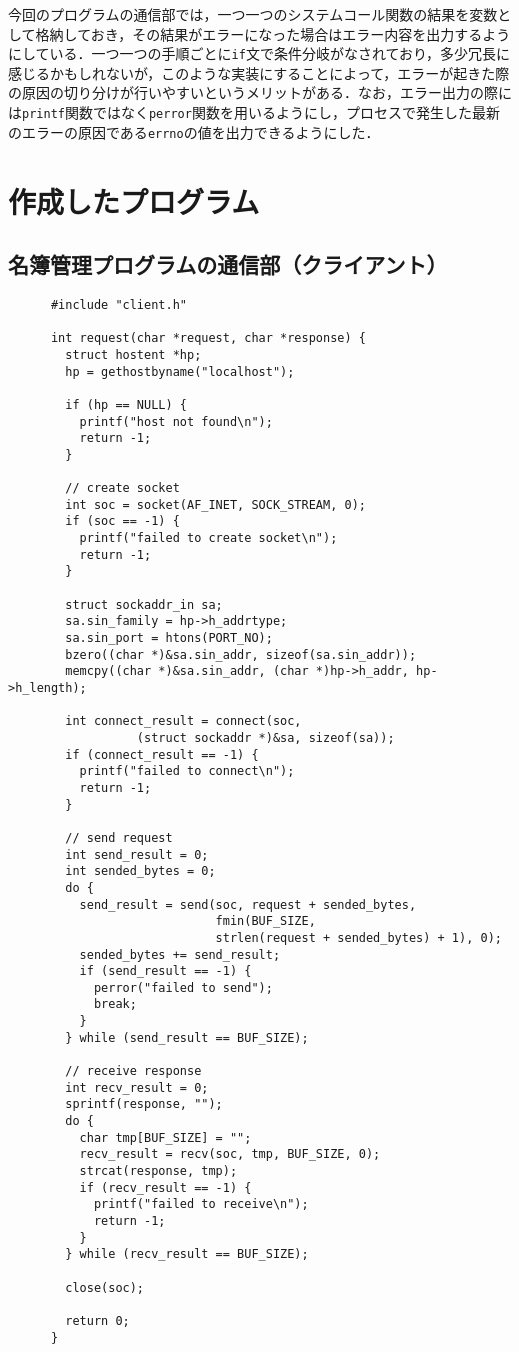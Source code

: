 \documentclass[11pt]{jsarticle}
\begin{document}
今回のプログラムの通信部では，一つ一つのシステムコール関数の結果を変数として格納しておき，その結果がエラーになった場合はエラー内容を出力するようにしている．一つ一つの手順ごとに{\tt if}文で条件分岐がなされており，多少冗長に感じるかもしれないが，このような実装にすることによって，エラーが起きた際の原因の切り分けが行いやすいというメリットがある．なお，エラー出力の際には{\tt printf}関数ではなく{\tt perror}関数を用いるようにし，プロセスで発生した最新のエラーの原因である{\tt errno}の値を出力できるようにした．

\section{作成したプログラム}

\subsection{名簿管理プログラムの通信部（クライアント）} \label{sec:client.c}

\begin{verbatim}
      #include "client.h"

      int request(char *request, char *response) {
        struct hostent *hp;
        hp = gethostbyname("localhost");
      
        if (hp == NULL) {
          printf("host not found\n");
          return -1;
        }
      
        // create socket
        int soc = socket(AF_INET, SOCK_STREAM, 0);
        if (soc == -1) {
          printf("failed to create socket\n");
          return -1;
        }
      
        struct sockaddr_in sa;
        sa.sin_family = hp->h_addrtype;
        sa.sin_port = htons(PORT_NO);
        bzero((char *)&sa.sin_addr, sizeof(sa.sin_addr));
        memcpy((char *)&sa.sin_addr, (char *)hp->h_addr, hp->h_length);
      
        int connect_result = connect(soc, 
                  (struct sockaddr *)&sa, sizeof(sa));
        if (connect_result == -1) {
          printf("failed to connect\n");
          return -1;
        }
      
        // send request
        int send_result = 0;
        int sended_bytes = 0;
        do {
          send_result = send(soc, request + sended_bytes,
                             fmin(BUF_SIZE, 
                             strlen(request + sended_bytes) + 1), 0);
          sended_bytes += send_result;
          if (send_result == -1) {
            perror("failed to send");
            break;
          }
        } while (send_result == BUF_SIZE);
      
        // receive response
        int recv_result = 0;
        sprintf(response, "");
        do {
          char tmp[BUF_SIZE] = "";
          recv_result = recv(soc, tmp, BUF_SIZE, 0);
          strcat(response, tmp);
          if (recv_result == -1) {
            printf("failed to receive\n");
            return -1;
          }
        } while (recv_result == BUF_SIZE);
      
        close(soc);
      
        return 0;
      }
\end{verbatim}
\end{document}
